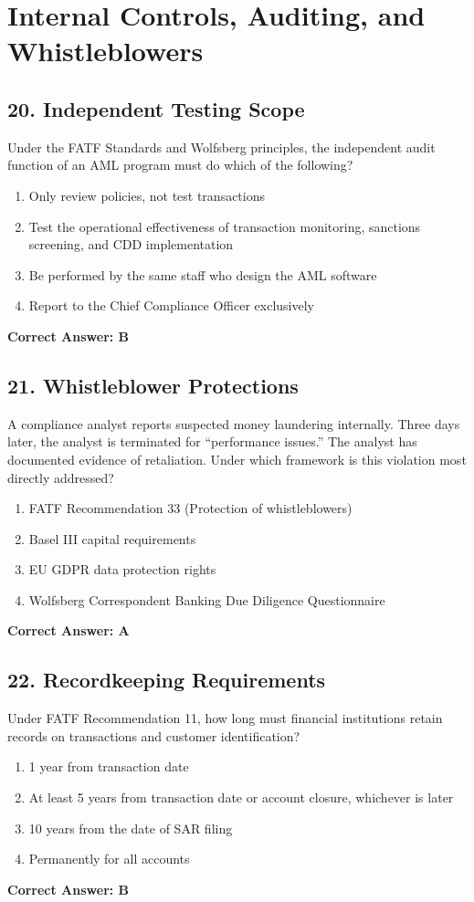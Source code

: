\documentclass[11pt,a4paper]{article}
\begin{document}
	\section{Internal Controls, Auditing, and Whistleblowers}
	
	\subsection{20. Independent Testing Scope}
	Under the FATF Standards and Wolfsberg principles, the independent audit function of an AML program must do which of the following?
	\begin{enumerate}[label=\Alph*.]
		\item Only review policies, not test transactions
		\item Test the operational effectiveness of transaction monitoring, sanctions screening, and CDD implementation
		\item Be performed by the same staff who design the AML software
		\item Report to the Chief Compliance Officer exclusively
	\end{enumerate}
	\textbf{Correct Answer: B}
	
	\subsection{21. Whistleblower Protections}
	A compliance analyst reports suspected money laundering internally. Three days later, the analyst is terminated for “performance issues.” The analyst has documented evidence of retaliation. Under which framework is this violation most directly addressed?
	\begin{enumerate}[label=\Alph*.]
		\item FATF Recommendation 33 (Protection of whistleblowers)
		\item Basel III capital requirements
		\item EU GDPR data protection rights
		\item Wolfsberg Correspondent Banking Due Diligence Questionnaire
	\end{enumerate}
	\textbf{Correct Answer: A}
	
	\subsection{22. Recordkeeping Requirements}
	Under FATF Recommendation 11, how long must financial institutions retain records on transactions and customer identification?
	\begin{enumerate}[label=\Alph*.]
		\item 1 year from transaction date
		\item At least 5 years from transaction date or account closure, whichever is later
		\item 10 years from the date of SAR filing
		\item Permanently for all accounts
	\end{enumerate}
	\textbf{Correct Answer: B}
	
\end{document}
